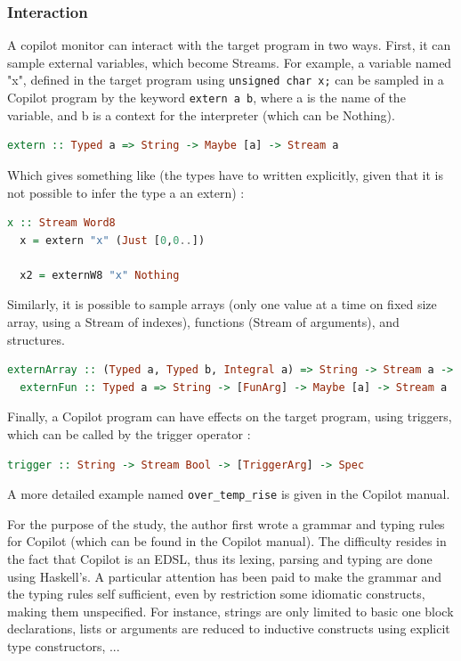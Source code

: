 \documentclass[a4paper,11pt,final]{article}
\begin{document}
  \subsubsection{Interaction}
  A copilot monitor can interact with the target program in two ways. First, it can sample external variables, which become Streams. For example, a variable named "x", defined in the target program using \texttt{unsigned char x;} can be sampled in a Copilot program by the keyword \texttt{extern a b}, where a is the name of the variable, and b is a context for the interpreter (which can be Nothing).
  \begin{lstlisting}[language=Haskell]
  extern :: Typed a => String -> Maybe [a] -> Stream a
  \end{lstlisting}
  
  Which gives something like (the types have to written explicitly, given that it is not possible to infer the type a an extern) :
  
  \begin{lstlisting}[language=Haskell]
  x :: Stream Word8
  x = extern "x" (Just [0,0..])
  
  x2 = externW8 "x" Nothing
  \end{lstlisting}
  
  Similarly, it is possible to sample arrays (only one value at a time on fixed size array, using a Stream of indexes), functions (Stream of arguments), and structures.
  
  \begin{lstlisting}[language=Haskell]
  externArray :: (Typed a, Typed b, Integral a) => String -> Stream a -> Int -> Maybe [[a]] -> Stream b
  externFun :: Typed a => String -> [FunArg] -> Maybe [a] -> Stream a
  \end{lstlisting}
  
  Finally, a Copilot program can have effects on the target program, using triggers, which can be called by the trigger operator :
  
  \begin{lstlisting}[language=Haskell]
  trigger :: String -> Stream Bool -> [TriggerArg] -> Spec
  \end{lstlisting}
  
  A more detailed example named \texttt{over\_temp\_rise} is given in the Copilot manual\cite{Copilot07}. 
  
  For the purpose of the study, the author first wrote a grammar and typing rules for Copilot (which can be found in the Copilot manual\cite{Copilot08}). The difficulty resides in the fact that Copilot is an EDSL, thus its lexing, parsing and typing are done using Haskell's. A particular attention has been paid to make the grammar and the typing rules self sufficient, even by restriction some idiomatic constructs, making them unspecified. For instance, strings are only limited to basic one block declarations, lists or arguments are reduced to inductive constructs using explicit type constructors, ...
  
\end{document}
